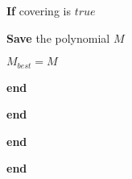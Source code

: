 \begin{centering}
\begin{block}
\hspace{15mm}\textbf{If} covering is $true$

\hspace{20mm}\textbf{Save} the polynomial $M$

\hspace{25mm}$M_{best}  = M$ 

\hspace{15mm}\textbf{end}

\hspace{10mm}\textbf{end}

\hspace{5mm}\textbf{end}

\textbf{end}

\end{block}

\end{centering}